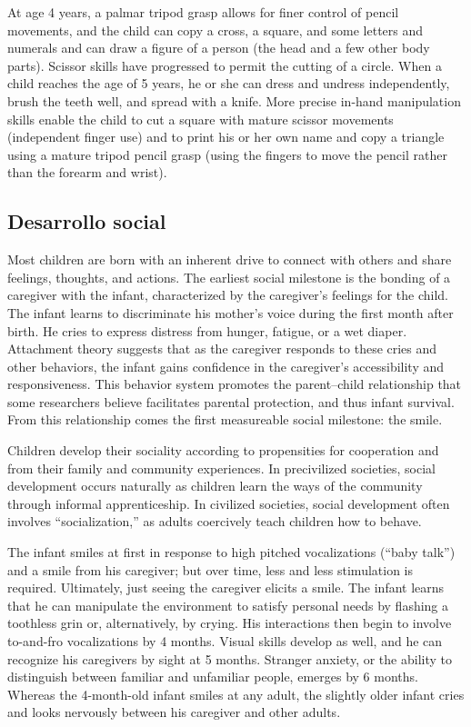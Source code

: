 At age 4 years, a palmar tripod grasp allows for finer control of pencil
movements, and the child can copy a cross, a square, and some letters and
numerals and can draw a figure of a person (the head and a few other body
parts). Scissor skills have progressed to permit the cutting of a circle. When
a child reaches the age of 5 years, he or she can dress and undress
independently, brush the teeth well, and spread with a knife. More precise
in-hand manipulation skills enable the child to cut a square with mature
scissor movements (independent finger use) and to print his or her own name and
copy a triangle using a mature tripod pencil grasp (using the fingers to move
the pencil rather than the forearm and wrist). \cite{Gerber2010}

\subsection{Desarrollo social}

Most children are born with an inherent drive to connect with others and share
feelings, thoughts, and actions. The earliest social milestone is the bonding
of a caregiver with the infant, characterized by the caregiver’s feelings for
the child. The infant learns to discriminate his mother’s voice during the
first month after birth. He cries to express distress from hunger, fatigue, or
a wet diaper. Attachment theory suggests that as the caregiver responds to
these cries and other behaviors, the infant gains confidence in the caregiver’s
accessibility and responsiveness. This behavior system promotes the
parent–child relationship that some researchers believe facilitates parental
protection, and thus infant survival. From this relationship comes the first
measureable social milestone: the smile. \cite{Gerber2011}

Children develop their sociality according to propensities for cooperation and
from their family and community experiences. In precivilized societies, social
development occurs naturally as children learn the ways of the community
through informal apprenticeship. In civilized societies, social development
often involves “socialization,” as adults coercively teach children how to
behave. \cite{Narvaez2021}

The infant smiles at first in response to high pitched vocalizations (“baby
talk”) and a smile from his caregiver; but over time, less and less stimulation
is required. Ultimately, just seeing the caregiver elicits a smile. The infant
learns that he can manipulate the environment to satisfy personal needs by
flashing a toothless grin or, alternatively, by crying. His interactions then
begin to involve to-and-fro vocalizations by 4 months. Visual skills develop as
well, and he can recognize his caregivers by sight at 5 months. Stranger
anxiety, or the ability to distinguish between familiar and unfamiliar people,
emerges by 6 months. Whereas the 4-month-old infant smiles at any adult, the
slightly older infant cries and looks nervously between his caregiver and other
adults. \cite{Gerber2011}

